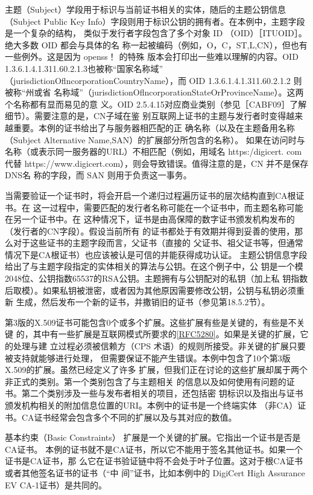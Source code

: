 主题（Subject）学段用于标识与当前证书相关的实体，随后的主题公钥信息（Subject
Public Key Info）字段则用于标识公钥的拥有者。在本例中，主题字段是一个复杂的结构，
类似于发行者字段包含了多个对象 ID （OID）［ITUOID］。绝大多数 OID 都会与具体的名
称一起被编码（例如，O，C，ST,L,CN），但也有一些例外。这是因为 openss！ 的特殊
版本会打印出一些难以理解的内容。OID 1.3.6.1.4.1.311.60.2.1.3也被称“国家名称域”
（jurisdictionOflncorporationCountryName），而 OID 1.3.6.1.4.1.311.60.2.1.2 则被称“州或省
名称域”（jurisdictionOflncorporationStateOrProvinceName）。这两个名称都有显而易见的意
义。OID 2.5.4.15对应商业类别（参见［CABF09］了解细节）。需要注意的是，CN子域在鉴
别互联网上证书的主题与发行者时变得越来越重要。本例的证书给出了与服务器相匹配的正
确名称（以及在主题备用名称（Subject Alternative Name,SAN）的扩展部分所包含的名称）。
如果在访问时与名称（或表示同一服务器的URL）不相匹配（例如，用域名 https:/digicert.
com 代替 https://www.digicert.com），则会导致错误。值得注意的是，CN 并不是保存DNS名
称的字段，而 SAN 则用于负责这一事务。

当需要验证一个证书时，将会开启一个递归过程遍历证书的层次结构直到CA根证书。在
这一过程中，需要匹配的发行者名称可能在一个证书中，而主题名称可能在另一个证书中。在
这种情况下，证书是由高保障的数字证书颁发机构发布的（发行者的CN字段）。假设当前所有
的证书都处于有效期并得到妥善的使用，那么对于这些证书的主题字段而言，父证书（直接的
父证书、祖父证书等，但通常情况下是CA根证书）也应该被认是可信的并能获得成功认证。
主题公钥信息字段给出了与主题字段指定的实体相关的算法与公钥。在这个例子中，公
钥是一个模2048位、公钥指数65537的RSA公钥。主题拥有与公钥配对的私钥（加上私
钥指数后取模）。如果私钥被泄密，或者因为其他原因需要修改公钥，公钥与私钥必须重新
生成，然后发布一个新的证书，并撒销旧的证书（参见第18.5.2节）。

第3版的X.509证书可能包含0个或多个扩展。这些扩展有些是关键的，有些是不关键
的，其中有一些扩展是互联网模式所要求的\href{https://www.rfc-editor.org/rfc/rfc5280}{[RFC5280]}。如果是关键的扩展，它的处理与建
立过程必须被信赖方（CPS 术语）的规则所接受。非关键的扩展只要被支持就能够进行处理，
但需要保证不能产生错误。本例中包含了10个第3版X.509的扩展。虽然已经定义了许多
扩展，但我们正在讨论的这些扩展却属于两个非正式的类别。第一个类别包含了与主题相关
的信息以及如何使用有问题的证书。第二个类别涉及一些与发布者相关的项目，还包括密
钥标识以及指出与证书颁发机构相关的附加信息位置的URI。本例中的证书是一个终端实体
（非CA）证书。CA证书经常会包含多个不同的扩展以及与其对应的数值。

基本约束（Basic Constraints） 扩展是一个关键的扩展。它指出一个证书是否是CA证书。
本例的证书就不是CA证书，所以它不能用于签名其他证书。如果一个证书是CA证书，那
么它在证书验证链中将不会处于叶子位置。这对于根CA证书或者其他签名证书的证书（“中
间”证书，比如本例中的 DigiCert High Assurance EV CA-1证书）是共同的。

